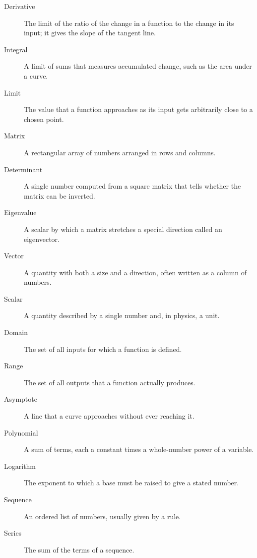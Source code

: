 \documentclass[11pt]{article}
\begin{document}
\begin{description}

\item[Derivative] The limit of the ratio of the change in a function to the change in its input; it gives the slope of the tangent line.

\item[Integral] A limit of sums that measures accumulated change, such as the area under a curve.

\item[Limit] The value that a function approaches as its input gets arbitrarily close to a chosen point.

\item[Matrix] A rectangular array of numbers arranged in rows and columns.

\item[Determinant] A single number computed from a square matrix that tells whether the matrix can be inverted.

\item[Eigenvalue] A scalar by which a matrix stretches a special direction called an eigenvector.

\item[Vector] A quantity with both a size and a direction, often written as a column of numbers.

\item[Scalar] A quantity described by a single number and, in physics, a unit.

\item[Domain] The set of all inputs for which a function is defined.

\item[Range] The set of all outputs that a function actually produces.

\item[Asymptote] A line that a curve approaches without ever reaching it.

\item[Polynomial] A sum of terms, each a constant times a whole-number power of a variable.

\item[Logarithm] The exponent to which a base must be raised to give a stated number.

\item[Sequence] An ordered list of numbers, usually given by a rule.

\item[Series] The sum of the terms of a sequence.


\end{description}
\end{document}
